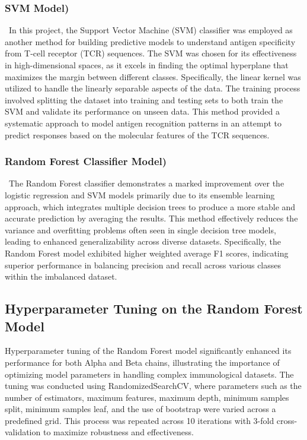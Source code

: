 \documentclass[conference]{IEEEtran}
\begin{document}
    \subsubsection{SVM Model)} \
    In this project, the Support Vector Machine (SVM) classifier was employed as another method for building predictive models to understand antigen specificity from T-cell receptor (TCR) sequences. The SVM was chosen for its effectiveness in high-dimensional spaces, as it excels in finding the optimal hyperplane that maximizes the margin between different classes. Specifically, the linear kernel was utilized to handle the linearly separable aspects of the data. The training process involved splitting the dataset into training and testing sets to both train the SVM and validate its performance on unseen data. This method provided a systematic approach to model antigen recognition patterns in an attempt to predict responses based on the molecular features of the TCR sequences.
    \\
    
    \subsubsection{Random Forest Classifier Model)} \
    The Random Forest classifier demonstrates a marked improvement over the logistic regression and SVM models primarily due to its ensemble learning approach, which integrates multiple decision trees to produce a more stable and accurate prediction by averaging the results. This method effectively reduces the variance and overfitting problems often seen in single decision tree models, leading to enhanced generalizability across diverse datasets. Specifically, the Random Forest model exhibited higher weighted average F1 scores, indicating superior performance in balancing precision and recall across various classes within the imbalanced dataset.
    \\

    \subsection{Hyperparameter Tuning on the Random Forest Model}
	Hyperparameter tuning of the Random Forest model significantly enhanced its performance for both Alpha and Beta chains, illustrating the importance of optimizing model parameters in handling complex immunological datasets. The tuning was conducted using RandomizedSearchCV, where parameters such as the number of estimators, maximum features, maximum depth, minimum samples split, minimum samples leaf, and the use of bootstrap were varied across a predefined grid. This process was repeated across 10 iterations with 3-fold cross-validation to maximize robustness and effectiveness.
    \\
    
\end{document}
